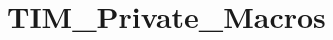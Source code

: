 \hypertarget{group___t_i_m___private___macros}{\section{T\-I\-M\-\_\-\-Private\-\_\-\-Macros}
\label{group___t_i_m___private___macros}
}
